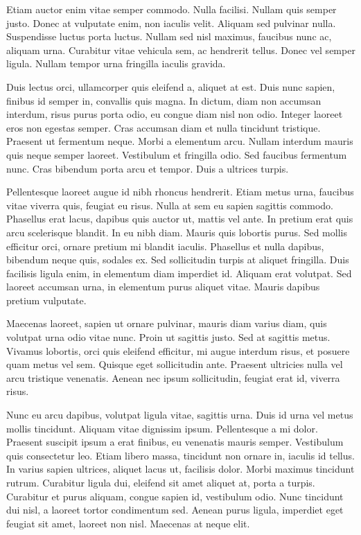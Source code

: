\documentclass{article}
\begin{document}
Etiam auctor enim vitae semper commodo. Nulla facilisi. Nullam quis semper justo. Donec at vulputate enim, non iaculis velit. Aliquam sed pulvinar nulla. Suspendisse luctus porta luctus. Nullam sed nisl maximus, faucibus nunc ac, aliquam urna. Curabitur vitae vehicula sem, ac hendrerit tellus. Donec vel semper ligula. Nullam tempor urna fringilla iaculis gravida.

Duis lectus orci, ullamcorper quis eleifend a, aliquet at est. Duis nunc sapien, finibus id semper in, convallis quis magna. In dictum, diam non accumsan interdum, risus purus porta odio, eu congue diam nisl non odio. Integer laoreet eros non egestas semper. Cras accumsan diam et nulla tincidunt tristique. Praesent ut fermentum neque. Morbi a elementum arcu. Nullam interdum mauris quis neque semper laoreet. Vestibulum et fringilla odio. Sed faucibus fermentum nunc. Cras bibendum porta arcu et tempor. Duis a ultrices turpis.

Pellentesque laoreet augue id nibh rhoncus hendrerit. Etiam metus urna, faucibus vitae viverra quis, feugiat eu risus. Nulla at sem eu sapien sagittis commodo. Phasellus erat lacus, dapibus quis auctor ut, mattis vel ante. In pretium erat quis arcu scelerisque blandit. In eu nibh diam. Mauris quis lobortis purus. Sed mollis efficitur orci, ornare pretium mi blandit iaculis. Phasellus et nulla dapibus, bibendum neque quis, sodales ex. Sed sollicitudin turpis at aliquet fringilla. Duis facilisis ligula enim, in elementum diam imperdiet id. Aliquam erat volutpat. Sed laoreet accumsan urna, in elementum purus aliquet vitae. Mauris dapibus pretium vulputate.

Maecenas laoreet, sapien ut ornare pulvinar, mauris diam varius diam, quis volutpat urna odio vitae nunc. Proin ut sagittis justo. Sed at sagittis metus. Vivamus lobortis, orci quis eleifend efficitur, mi augue interdum risus, et posuere quam metus vel sem. Quisque eget sollicitudin ante. Praesent ultricies nulla vel arcu tristique venenatis. Aenean nec ipsum sollicitudin, feugiat erat id, viverra risus.

Nunc eu arcu dapibus, volutpat ligula vitae, sagittis urna. Duis id urna vel metus mollis tincidunt. Aliquam vitae dignissim ipsum. Pellentesque a mi dolor. Praesent suscipit ipsum a erat finibus, eu venenatis mauris semper. Vestibulum quis consectetur leo. Etiam libero massa, tincidunt non ornare in, iaculis id tellus. In varius sapien ultrices, aliquet lacus ut, facilisis dolor. Morbi maximus tincidunt rutrum. Curabitur ligula dui, eleifend sit amet aliquet at, porta a turpis. Curabitur et purus aliquam, congue sapien id, vestibulum odio. Nunc tincidunt dui nisl, a laoreet tortor condimentum sed. Aenean purus ligula, imperdiet eget feugiat sit amet, laoreet non nisl. Maecenas at neque elit.
\end{document}
